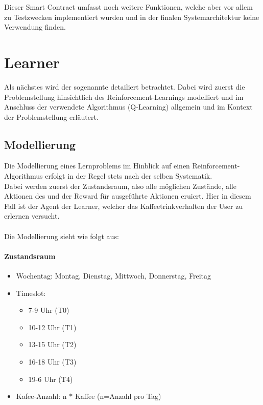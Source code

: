 Dieser Smart Contract umfasst noch weitere Funktionen, welche aber vor allem zu Testzwecken implementiert wurden und in der finalen Systemarchitektur keine Verwendung finden. 


\section{Learner}
\label{sec:ql}
Als nächstes wird der sogenannte  detailiert betrachtet. Dabei wird zuerst die Problemstellung hinsichtlich des Reinforcement-Learnings modelliert und im Anschluss der verwendete Algorithmus (Q-Learning) allgemein und im Kontext der Problemstellung erläutert. \\

\subsection{Modellierung}
\label{subsec:modulation}
Die Modellierung eines Lernproblems im Hinblick auf einen Reinforcement-Algorithmus erfolgt in der Regel stets nach der selben Systematik. \\
Dabei werden zuerst der Zustandsraum, also alle möglichen Zustände, alle Aktionen des  und der Reward für ausgeführte Aktionen eruiert.
Hier in diesem Fall ist der Agent der Learner, welcher das Kaffeetrinkverhalten der User zu erlernen versucht.\\\\
Die Modellierung sieht wie folgt aus: 
\paragraph{Zustandsraum}
\begin{itemize}
	\item Wochentag: Montag, Dienstag, Mittwoch, Donnerstag, Freitag
	\item Timeslot:
	      \begin{itemize}
	      	\item 7-9 Uhr (T0)
	      	\item 10-12 Uhr (T1)
	      	\item 13-15 Uhr (T2)
	      	\item 16-18 Uhr (T3)
	      	\item 19-6 Uhr (T4)
	      \end{itemize} 
	\item Kafee-Anzahl: n $*$ Kaffee (n=Anzahl pro Tag)
\end{itemize}

